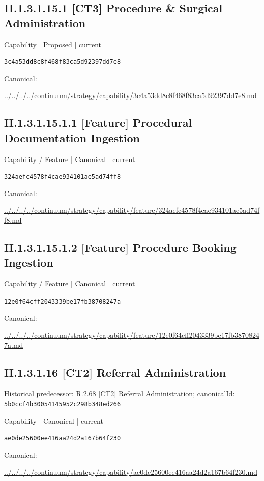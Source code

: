 \documentclass[10pt,a4paper]{article}
\begin{document}
\subsection*{II.1.3.1.15.1 [CT3] Procedure \& Surgical Administration}
\label{element-3c4a53dd8c8f468f83ca5d92397dd7e8}
{\small Capability | Proposed | current}\par
\texttt{3c4a53dd8c8f468f83ca5d92397dd7e8}\par
Canonical: \par
{\footnotesize\url{../../../../continuum/strategy/capability/3c4a53dd8c8f468f83ca5d92397dd7e8.md}}\par
\subsection*{II.1.3.1.15.1.1 [Feature] Procedural Documentation Ingestion}
\label{element-324aefc4578f4cae934101ae5ad74ff8}
{\small Capability / Feature | Canonical | current}\par
\texttt{324aefc4578f4cae934101ae5ad74ff8}\par
Canonical: \par
{\footnotesize\url{../../../../continuum/strategy/capability/feature/324aefc4578f4cae934101ae5ad74ff8.md}}\par
\subsection*{II.1.3.1.15.1.2 [Feature] Procedure Booking Ingestion}
\label{element-12e0f64cff2043339be17fb38708247a}
{\small Capability / Feature | Canonical | current}\par
\texttt{12e0f64cff2043339be17fb38708247a}\par
Canonical: \par
{\footnotesize\url{../../../../continuum/strategy/capability/feature/12e0f64cff2043339be17fb38708247a.md}}\par
\subsection*{II.1.3.1.16 [CT2] Referral Administration}
Historical predecessor: \hyperref[element-5b0ccf4b30054145952c298b348ed266]{R.2.68 [CT2] Referral Administration}; canonicalId: \texttt{5b0ccf4b30054145952c298b348ed266}\par
\label{element-ae0de25600ee416aa24d2a167b64f230}
{\small Capability | Canonical | current}\par
\texttt{ae0de25600ee416aa24d2a167b64f230}\par
Canonical: \par
{\footnotesize\url{../../../../continuum/strategy/capability/ae0de25600ee416aa24d2a167b64f230.md}}\par
\end{document}
